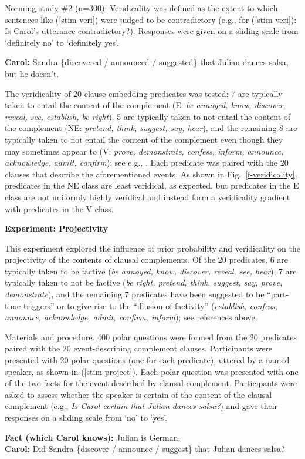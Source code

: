 \documentclass[12pt,fleqn]{article}
\newcommand{\6}{\mbox{$[\hspace*{-.6mm}[$}}
\newcommand{\9}{\mbox{$]\hspace*{-.6mm}]$}}
\begin{document}
\underline{Norming study \#2 (n=300):} Veridicality was defined as the extent to which sentences like (\ref{stim-veri}) were judged to be contradictory (e.g., for (\ref{stim-veri}): Is Carol's utterance contradictory?). Responses were given on a sliding scale from `definitely no' to `definitely yes'. 
\vspace*{-.2cm}
\begin{exe}
\ex\label{stim-veri} {\bf Carol:} Sandra \{discovered / announced / suggested\} that Julian dances salsa, but he doesn't. 
\end{exe}
\vspace*{-.2cm}
The veridicality of 20 clause-embedding predicates was tested: 7 are typically taken to entail the content of the complement (E: {\em be annoyed, know, discover, reveal, see, establish, be right}), 5 are typically taken to not entail the content of the complement (NE: {\em pretend, think, suggest, say, hear}), and the remaining 8 are typically taken to not entail the content of the complement even though they may sometimes appear to (V: {\em prove, demonstrate, confess, inform, announce, acknowledge, admit, confirm}); see e.g., \citealt{schlenker10,swanson2012,anand-hacquard2014}. Each predicate was paired with the 20 clauses that describe the aforementioned events. As shown in Fig.~\ref{f-veridicality}, predicates in the NE class are least veridical, as expected, but predicates in the E class are not uniformly highly veridical and instead form a veridicality gradient with predicates in the V class.

{\bf Experiment: Projectivity}

This experiment explored the influence of prior probability and veridicality on the projectivity of the contents of clausal complements. Of the 20 predicates, 6 are typically taken to be factive ({\em be annoyed, know, discover, reveal, see, hear}), 7 are typically taken to not be factive ({\em be right, pretend, think, suggest, say, prove, demonstrate}), and the remaining 7 predicates have been suggested to be ``part-time triggers'' or to give rise to the ``illusion of factivity'' ({\em establish,  confess, announce, acknowledge, admit, confirm, inform}); see references above.

\underline{Materials and procedure.} 400 polar questions were formed from the 20 predicates paired with the 20 event-describing complement clauses. Participants were presented with 20 polar questions (one for each predicate), uttered by a named speaker, as shown in (\ref{stim-project}). Each polar question was presented with one of the two facts for the event described by clausal complement. Participants were asked to assess whether the speaker is certain of the content of the clausal complement (e.g., \emph{Is Carol certain that Julian dances salsa?}) and gave their responses on a sliding scale from `no' to `yes'. 
\vspace*{-.2cm}
\begin{exe}
\ex\label{stim-project} {\bf Fact (which Carol knows):} Julian is German.  \\ 
{\bf Carol:} Did Sandra \{discover / announce / suggest\} that Julian dances salsa?
\end{exe}
\vspace*{-.2cm}
\end{document}
